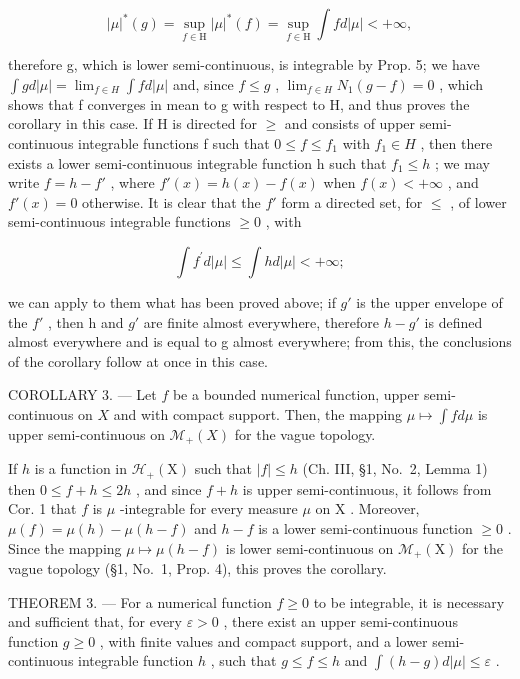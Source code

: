 \[
| \mu | ^ {*} (g) = \sup _ {f \in \mathrm{H}} | \mu | ^ {*} (f) = \sup _ {f \in \mathrm{H}} \int f d | \mu | <   + \infty ,
\]

therefore g, which is lower semi-continuous, is integrable by Prop. 5; we have \(\int g d|\mu| = \lim_{f \in H} \int f d|\mu|\) and, since \(f \leqslant g\) , \(\lim_{f \in H} N_1(g - f) = 0\) , which shows that f converges in mean to g with respect to H, and thus proves the corollary in this case. If H is directed for \(\geqslant\) and consists of upper semi-continuous integrable functions f such that \(0 \leqslant f \leqslant f_1\) with \(f_1 \in H\) , then there exists a lower semi-continuous integrable function h such that \(f_1 \leqslant h\) ; we may write \(f = h - f'\) , where \(f'(x) = h(x) - f(x)\) when \(f(x) < +\infty\) , and \(f'(x) = 0\) otherwise. It is clear that the \(f'\) form a directed set, for \(\leqslant\) , of lower semi-continuous integrable functions \(\geqslant 0\) , with

\[
\int f ^ {\prime} d | \mu | \leqslant \int h d | \mu | <   + \infty ;
\]

we can apply to them what has been proved above; if \(g'\) is the upper envelope of the \(f'\) , then h and \(g'\) are finite almost everywhere, therefore \(h - g'\) is defined almost everywhere and is equal to g almost everywhere; from this, the conclusions of the corollary follow at once in this case.

COROLLARY 3. --- Let \(f\) be a bounded numerical function, upper semi-continuous on \(X\) and with compact support. Then, the mapping \(\mu \mapsto \int f d\mu\) is upper semi-continuous on \(\mathcal{M}_{+}(X)\) for the vague topology.

If \(h\) is a function in \(\mathcal{H}_{+}(\mathrm{X})\) such that \(|f| \leqslant h\) (Ch. III, §1, No.~2, Lemma 1) then \(0 \leqslant f + h \leqslant 2h\) , and since \(f + h\) is upper semi-continuous, it follows from Cor. 1 that \(f\) is \(\mu\) -integrable for every measure \(\mu\) on \(\mathrm{X}\) . Moreover, \(\mu(f) = \mu(h) - \mu(h - f)\) and \(h - f\) is a lower semi-continuous function \(\geqslant 0\) . Since the mapping \(\mu \mapsto \mu(h - f)\) is lower semi-continuous on \(\mathcal{M}_{+}(\mathrm{X})\) for the vague topology (§1, No.~1, Prop. 4), this proves the corollary.

THEOREM 3. --- For a numerical function \(f \geqslant 0\) to be integrable, it is necessary and sufficient that, for every \(\varepsilon > 0\) , there exist an upper semi-continuous function \(g \geqslant 0\) , with finite values and compact support, and a lower semi-continuous integrable function \(h\) , such that \(g \leqslant f \leqslant h\) and \(\int (h - g) d|\mu| \leqslant \varepsilon\) .

